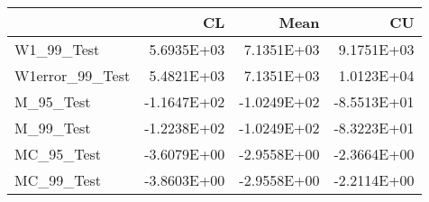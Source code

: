 \begin{tabular}{lrrr}
\toprule
{} &          CL &        Mean &          CU \\
\midrule
W1\_99\_Test      &  5.6935E+03 &  7.1351E+03 &  9.1751E+03 \\
W1error\_99\_Test &  5.4821E+03 &  7.1351E+03 &  1.0123E+04 \\
M\_95\_Test       & -1.1647E+02 & -1.0249E+02 & -8.5513E+01 \\
M\_99\_Test       & -1.2238E+02 & -1.0249E+02 & -8.3223E+01 \\
MC\_95\_Test      & -3.6079E+00 & -2.9558E+00 & -2.3664E+00 \\
MC\_99\_Test      & -3.8603E+00 & -2.9558E+00 & -2.2114E+00 \\
\bottomrule
\end{tabular}
